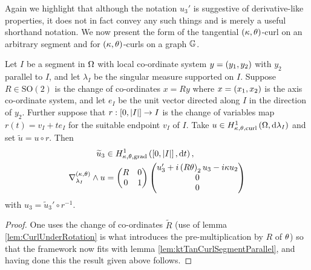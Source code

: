 Again we highlight that although the notation $u_3'$ is suggestive of derivative-like properties, it does not in fact convey any such things and is merely a useful shorthand notation.
We now present the form of the tangential $\left( \kappa, \theta \right)$-curl on an arbitrary segment and for $\left( \kappa, \theta \right)$-curls on a graph $\mathbb{G}$.
\begin{lemma} \label{ktTanCurlGeneralSegment}
	Let $I$ be a segment in $\Omega$ with local co-ordinate system $y=\left( y_1,y_2 \right)$ with $y_2$ parallel to $I$, and let $\lambda_I$ be the singular measure supported on $I$.
	Suppose $R\in\mathrm{SO}(2)$ is the change of co-ordinates $x=Ry$ where $x=\left( x_1,x_2 \right)$ is the axis co-ordinate system, and let $e_I$ be the unit vector directed along $I$ in the direction of $y_2$.
	Further suppose that $r:\left[ 0,\left\lvert I \right\rvert \right]\rightarrow I$ is the change of variables map $r(t) = v_I + te_I$ for the suitable endpoint $v_I$ of $I$.
	Take $u\in H^1_{\kappa,\theta,\mathrm{curl}}\left( \Omega, \mathrm{d}\lambda_I \right)$ and set $\widetilde{u} = u \circ r$.
	Then
	\begin{align*}
		\widetilde{u}_3 &\in H^1_{\kappa,\theta,\mathrm{grad}}\left( \left[ 0,\left\lvert I \right\rvert \right], \mathrm{d}t \right), \\
		\nabla_{\lambda_I}^{\left( \kappa, \theta \right)}\wedge u &= \begin{pmatrix} R & 0 \\ 0 & 1 \end{pmatrix} \begin{pmatrix} u_3' + i\left( R\theta \right)_2u_3 - i\kappa u_2 \\ 0 \\ 0 \end{pmatrix}
	\end{align*}
	with $u_3 = \widetilde{u}_3' \circ r^{-1}$.
\end{lemma}
\begin{proof}
	One uses the change of co-ordinates $\widetilde{R}$ (use of lemma  \ref{lem:CurlUnderRotation} is what introduces the pre-multiplication by $R$ of $\theta$) so that the framework now fits with lemma \ref{lem:ktTanCurlSegmentParallel}, and having done this the result given above follows.
\end{proof}

